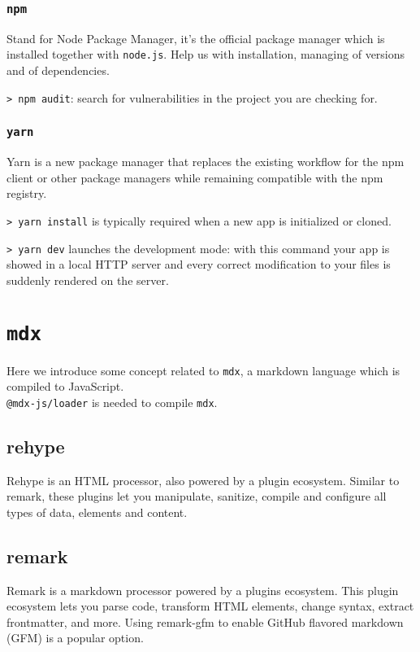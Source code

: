 \documentclass[11pt]{article}
\newcommand{\cmd}[1]{\colorbox{light-gray}{\textcolor{gio}{\texttt{#1}}}}
\begin{document}
\begin{multicols}{2}
\subsubsection{\texttt{npm}}
Stand for Node Package Manager, it's the official package manager which is 
installed together with \texttt{node.js}. Help us with installation, managing of 
versions and of dependencies.

\cmd{> npm audit}: search for vulnerabilities in the project you are checking for.

\subsubsection{\texttt{yarn}}

Yarn is a new package manager that replaces the existing workflow for the npm 
client or other package managers while remaining compatible with the npm registry. 

\cmd{> yarn install} is typically required when a new app is initialized or cloned.

\cmd{> yarn dev} launches the development mode: with this command your app is
showed in a local HTTP server and every correct modification to your files is
suddenly rendered on the server.

\section{\texttt{mdx}}

Here we introduce some concept related to \texttt{mdx}, a markdown language which 
is compiled to JavaScript. \\

\cmd{@mdx-js/loader} is needed to compile \texttt{mdx}.

\subsection{rehype}

Rehype is an HTML processor, also powered by a plugin ecosystem. Similar to remark, 
these plugins let you manipulate, sanitize, compile and configure all types of data, 
elements and content.

\subsection{remark}

Remark is a markdown processor powered by a plugins ecosystem. This plugin ecosystem 
lets you parse code, transform HTML elements, change syntax, extract frontmatter, 
and more. Using remark-gfm to enable GitHub flavored markdown (GFM) is a popular option.


\end{multicols}
\end{document}
